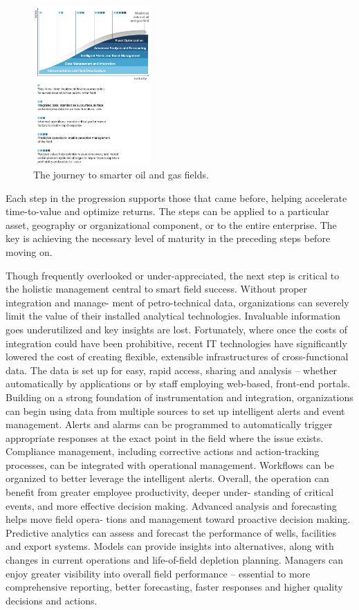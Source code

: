 \documentclass[twocolumn]{article}
\begin{document}
\begin{figure}[htb]
      \centering
      \includegraphics[width=0.4\textwidth]{figure01}
      \caption{The journey to smarter oil and gas fields.}
      \label{fig1}
\end{figure}

Each step in the progression supports those that came before, helping accelerate time-to-value and optimize returns. The steps can be applied to a particular asset, geography or organizational component, or to the entire enterprise. The key is achieving the necessary level of maturity in the preceding steps before moving on.

Though frequently overlooked or under-appreciated, the
next step is critical to the holistic management central to smart field success. Without proper integration and manage- ment of petro-technical data, organizations can severely limit the value of their installed analytical technologies. Invaluable information goes underutilized and key insights are lost.
Fortunately, where once the costs of integration could have been prohibitive, recent IT technologies have significantly lowered the cost of creating flexible, extensible infrastructures of cross-functional data. The data is set up for easy, rapid access, sharing and analysis – whether automatically by applications or by staff employing web-based, front-end portals.
Building on a strong foundation of instrumentation and integration, organizations can begin using data from multiple sources to set up intelligent alerts and event management. Alerts and alarms can be programmed to automatically trigger appropriate responses at the exact point in the field where the issue exists. Compliance management, including corrective actions and action-tracking processes, can be integrated with operational management. Workflows can be organized to better leverage the intelligent alerts. Overall, the operation can benefit from greater employee productivity, deeper under- standing of critical events, and more effective decision making.
Advanced analysis and forecasting helps move field opera- tions and management toward proactive decision making. Predictive analytics can assess and forecast the performance of wells, facilities and export systems. Models can provide insights into alternatives, along with changes in current operations and life-of-field depletion planning. Managers
can enjoy greater visibility into overall field performance – essential to more comprehensive reporting, better forecasting, faster responses and higher quality decisions and actions.
\end{document}
